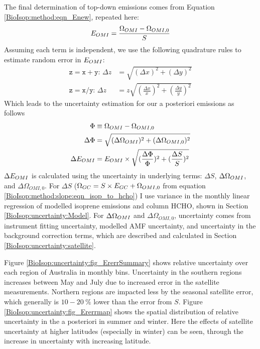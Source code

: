     The final determination of top-down emissions comes from Equation \ref{BioIsop:method:eqn_Enew}, repeated here: 
    \begin{equation*}
      E_{OMI}=\frac{\Omega_{OMI} - \Omega_{OMI,0}}{S}
    \end{equation*}
    Assuming each term is independent, we use the following quadrature rules to estimate random error in $E_{OMI}$:
    \begin{align}
      \mathtt{z=x+y:} \, \Delta{z} & = \sqrt{(\Delta{x})^2 + (\Delta{y})^2} \label{BioIsop:uncertainty:eqn_quadrature_add} \\
      \mathtt{z=x/y:} \, \Delta{z} & = z \sqrt{(\frac{\Delta{x}}{x})^2 + (\frac{\Delta{y}}{y})^2} \label{BioIsop:uncertainty:eqn_quadrature_divide} 
    \end{align}
    Which leads to the uncertainty estimation for our a posteriori emissions as follows
    \begin{align}
      \Phi & \equiv \Omega_{OMI} - \Omega_{OMI,0}   \notag \\
      \Delta{\Phi} & = \sqrt{(\Delta{\Omega_{OMI}})^2 + (\Delta{\Omega_{OMI,0}})^2}  \label{BioIsop:uncertainty:eomi:eqn_delta_Phi} \\
      \Delta{E_{OMI}} &= E_{OMI} \times \sqrt{(\frac{\Delta{\Phi}}{\Phi})^2 + (\frac{\Delta{S}}{S})^2} \label{BioIsop:uncertainty:eomi:eqn_delta_apost}
    \end{align}
    $\Delta{E_{OMI}}$ is calculated using the uncertainty in underlying terms: $\Delta{S}$, $\Delta{\Omega_{OMI}}$, and $\Delta{\Omega_{OMI,0}}$. 
    For $\Delta{S}$ ($\Omega_{GC} = S \times E_{GC} + \Omega_{OMI,0}$ from equation \ref{BioIsop:method:slope:eqn_isop_to_hcho}) I use variance in the monthly linear regression of modelled isoprene emissions and column HCHO, shown in Section \ref{BioIsop:uncertainty:Model}.
    For $\Delta \Omega_{OMI}$ and $\Delta \Omega_{OMI,0}$, uncertainty comes from instrument fitting uncertainty, modelled AMF uncertainty, and uncertainty in the background correction terms, which are described and calculated in Section \ref{BioIsop:uncertainty:satellite}.
    
    
    Figure \ref{BioIsop:uncertainty:fig_ErerrSummary} shows relative uncertainty over each region of Australia in monthly bins.
    Uncertainty in the southern regions increases between May and July due to increased error in the satellite measurements.
    Northern regions are impacted less by the seasonal satellite error, which generally is $10-20~\%$ lower than the error from $S$.
    Figure \ref{BioIsop:uncertainty:fig_Ererrmap} shows the spatial distribution of relative uncertainty in the a posteriori in summer and winter.
    Here the effects of satellite uncertainty at higher latitudes (especially in winter) can be seen, through the increase in uncertainty with increasing latitude.
    
